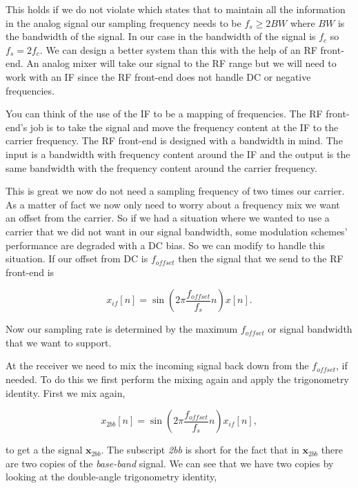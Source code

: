 This holds if we do not violate  which states that to maintain all the information in the analog signal our sampling frequency needs to be $f_s \geq 2BW$ where $BW$ is the bandwidth of the signal. In our case in  the bandwidth of the signal is $f_c$ so $f_s = 2f_c$. We can design a better system than this with the help of an \ac{RF} front-end. An analog mixer will take our signal to the \ac{RF} range but we will need to work with an \ac{IF} since the \ac{RF} front-end does not handle \ac{DC} or negative frequencies.

You can think of the use of the \ac{IF} to be a mapping of frequencies. The \ac{RF} front-end's job is to take the signal and move the frequency content at the \ac{IF} to the carrier frequency. The \ac{RF} front-end is designed with a bandwidth in mind. The input is a bandwidth with frequency content around the \ac{IF} and the output is the same bandwidth with the frequency content around the carrier frequency.

This is great we now do not need a sampling frequency of two times our carrier. As a matter of fact we now only need to worry about a frequency mix we want an offset from the carrier. So if we had a situation where we wanted to use a carrier that we did not want in our signal bandwidth, some modulation schemes' performance are degraded with a \ac{DC} bias. So we can modify  to handle this situation. If our offset from \ac{DC} is $f_{offset}$ then the signal that we send to the \ac{RF} front-end is

\begin{equation}
\label{eq:ifmix}
x_{if}[n] = \sin\left(2\pi\frac{f_{offset}}{f_s}n\right)x[n].
\end{equation}	

Now our sampling rate is determined by the maximum $f_{offset}$ or signal bandwidth that we want to support.

At the receiver we need to mix the incoming signal back down from the $f_{offset}$, if needed. To do this we first perform the mixing again and apply the trigonometry identity. First we mix again,

\begin{equation}
\label{eq:2xbb}
x_{2bb}[n] = \sin\left(2\pi\frac{f_{offset}}{f_s}n\right)x_{if}[n],
\end{equation}

to get a the signal $\mathbf{x}_{2bb}$. The subscript \emph{2bb} is short for the fact that in $\mathbf{x}_{2bb}$ there are two copies of the \emph{base-band} signal. We can see that we have two copies by looking at the double-angle trigonometry identity,

